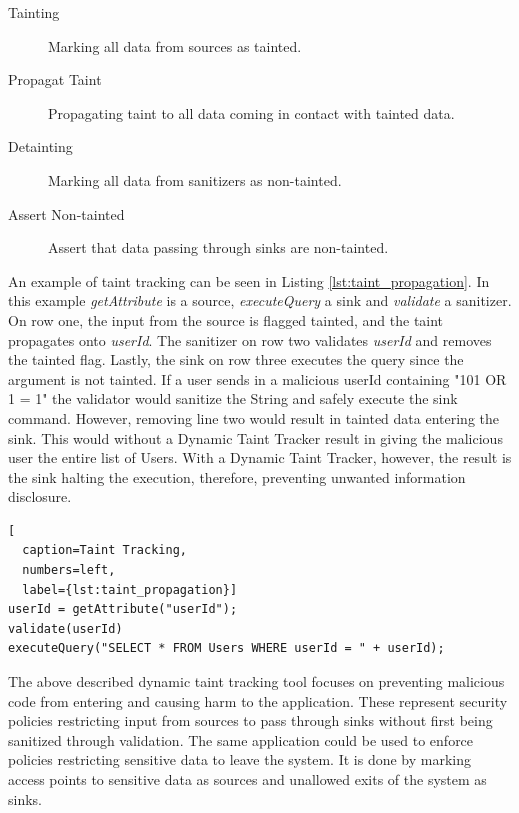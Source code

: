 \begin{table}[H]
  \centering
  \caption{Core logic behind taint tracking}
  \label{table:taintTracking}
  \begin{description}
    \item [Tainting] Marking all data from sources as tainted.
    \item [Propagat Taint] Propagating taint to all data coming in contact with tainted data.
    \item [Detainting] Marking all data from sanitizers as non-tainted.
    \item [Assert Non-tainted] Assert that data passing through sinks are non-tainted. 
  \end{description}
\end{table}

An example of taint tracking can be seen in Listing \ref{lst:taint_propagation}. In this example \textit{getAttribute} is a source, \textit{executeQuery} a sink and \textit{validate} a sanitizer. On row one, the input from the source is flagged tainted, and the taint propagates onto \textit{userId}. The sanitizer on row two validates \textit{userId} and removes the tainted flag. Lastly, the sink on row three executes the query since the argument is not tainted. If a user sends in a malicious userId containing "101 OR 1 = 1" the validator would sanitize the String and safely execute the sink command. However, removing line two would result in tainted data entering the sink. This would without a Dynamic Taint Tracker result in giving the malicious user the entire list of Users. With a Dynamic Taint Tracker, however, the result is the sink halting the execution, therefore, preventing unwanted information disclosure.

\hfill
\begin{lstlisting}[
  caption=Taint Tracking,
  numbers=left,
  label={lst:taint_propagation}]
userId = getAttribute("userId");
validate(userId)
executeQuery("SELECT * FROM Users WHERE userId = " + userId);
\end{lstlisting}
\hfill

The above described dynamic taint tracking tool focuses on preventing malicious code from entering and causing harm to the application. These represent security policies restricting input from sources to pass through sinks without first being sanitized through validation. The same application could be used to enforce policies restricting sensitive data to leave the system. It is done by marking access points to sensitive data as sources and unallowed exits of the system as sinks.



